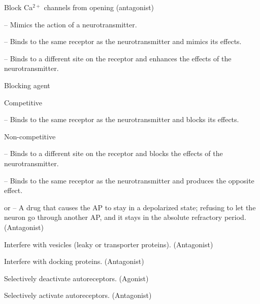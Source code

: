 \begin{coloredlist}
    \item Block Ca\(^{2+}\) channels from opening (antagonist)
    \item {} -- Mimics the action of a neurotransmitter.
    \begin{coloredlist}
        \item {} -- Binds to the same receptor as the neurotransmitter and mimics its effects.
        \item {} -- Binds to a different site on the receptor and enhances the effects of the neurotransmitter.
    \end{coloredlist}
    \item Blocking agent
    \begin{coloredlist}
        \item Competitive
        \begin{coloredlist}
            \item {} -- Binds to the same receptor as the neurotransmitter and blocks its effects.
        \end{coloredlist}
        \item Non-competitive
        \begin{coloredlist}
            \item {} -- Binds to a different site on the receptor and blocks the effects of the neurotransmitter.
        \end{coloredlist}
        \item {} -- Binds to the same receptor as the neurotransmitter and produces the opposite effect.
    \end{coloredlist}
    \item {} or  -- A drug that causes the AP to stay in a depolarized state; refusing to let the neuron go through another AP, and it stays in the absolute refractory period. (Antagonist)
    \item Interfere with vesicles (leaky or transporter proteins). (Antagonist)
    \item Interfere with docking proteins. (Antagonist)
    \item Selectively deactivate autoreceptors. (Agonist)
    \item Selectively activate autoreceptors. (Antagonist)
\end{coloredlist}

